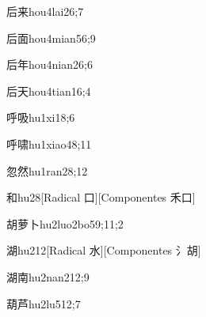 \begin{verbete}{后来}{hou4lai2}{6;7}
\end{verbete}

\begin{verbete}{后面}{hou4mian5}{6;9}
\end{verbete}

\begin{verbete}{后年}{hou4nian2}{6;6}
\end{verbete}

\begin{verbete}{后天}{hou4tian1}{6;4}
\end{verbete}

\begin{verbete}{呼吸}{hu1xi1}{8;6}
\end{verbete}

\begin{verbete}{呼啸}{hu1xiao4}{8;11}
\end{verbete}

\begin{verbete}{忽然}{hu1ran2}{8;12}
\end{verbete}

\begin{verbete}{和}{hu2}{8}[Radical 口][Componentes 禾口]
\end{verbete}

\begin{verbete}{胡萝卜}{hu2luo2bo5}{9;11;2}
\end{verbete}

\begin{verbete}{湖}{hu2}{12}[Radical 水][Componentes 氵胡]
\end{verbete}

\begin{verbete}{湖南}{hu2nan2}{12;9}
\end{verbete}

\begin{verbete}{葫芦}{hu2lu5}{12;7}
\end{verbete}

